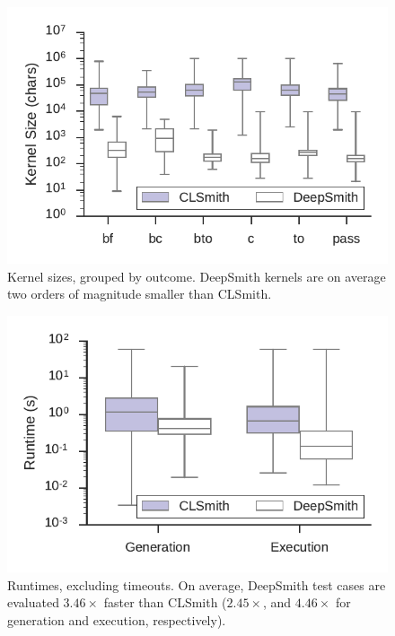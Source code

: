 \begin{figure}
  \centering %
  \includegraphics[width=.9\columnwidth]{build/img/kernel-sizes}%
  \caption{%
    Kernel sizes, grouped by outcome. DeepSmith kernels are on average two orders of magnitude smaller than CLSmith. %
  }%
  \label{fig:kernel-sizes} %
\end{figure}


\begin{figure}
  \centering %
  \includegraphics[width=.9\columnwidth]{build/img/runtimes}%
  \caption{%
    Runtimes, excluding timeouts. On average, DeepSmith test cases are evaluated $3.46\times$ faster than CLSmith ($2.45\times$, and $4.46\times$ for generation and execution, respectively).%
  }%
  \label{fig:runtimes} %
\end{figure}

